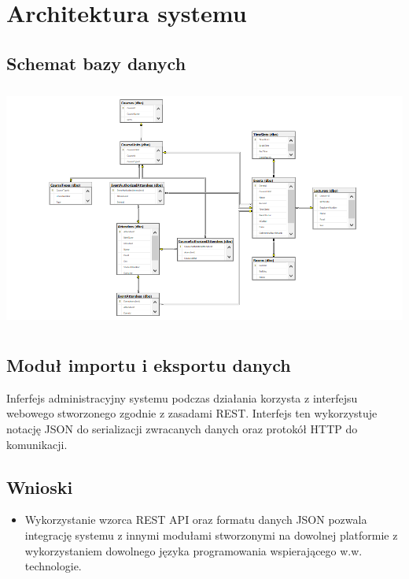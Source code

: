 \newpage\section{Architektura systemu \NazwaSys}\label{sec:model}
\subsection{Schemat bazy danych} \label{subsec:schemat}

\includegraphics[height=8cm]{BD}

\subsection{Moduł importu i eksportu danych}
Inferfejs administracyjny systemu podczas działania korzysta z interfejsu webowego stworzonego zgodnie z zasadami REST. Interfejs ten wykorzystuje notację JSON do serializacji zwracanych danych oraz protokół HTTP do komunikacji.

\subsection{Wnioski}
\begin{itemize}
    \item Wykorzystanie wzorca REST API oraz formatu danych JSON pozwala integrację systemu z innymi modułami stworzonymi na dowolnej platformie z wykorzystaniem dowolnego języka programowania wspierającego w.w. technologie.
\end{itemize}
